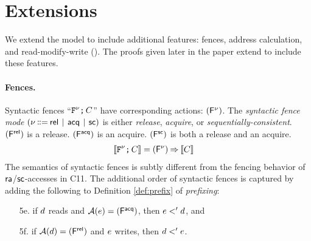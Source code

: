 \section{Extensions}
\label{sec:variants}

We extend the model to include additional
features: fences, address calculation, and read-modify-write (\RMW). The
proofs given later in the paper extend to include these features.  

\paragraph{Fences.}

Syntactic fences
``$\texttt{F}^{\nu} \texttt{;}\,\allowbreak C$'' have corresponding  actions: $(\smash{\mathsf{F}^{\nu}})$.  The \emph{syntactic fence mode}
$(\fmode \!\!\BNFDEF\!\! \modeREL \!\BNFSEP\! \modeACQ \!\BNFSEP\! \modeSC)$
is either \emph{release}, \emph{acquire}, or \emph{sequentially-consistent}.
$(\smash{\mathsf{F}^{{\mathsf{rel}}}})$ is a release. $(\smash{\mathsf{F}^{{\mathsf{acq}}}})$ is an acquire.
$(\smash{\mathsf{F}^{{\mathsf{sc}}}})$ is both a release and an acquire.
\begin{align*}
  \llbracket\texttt{F}^{\nu}\texttt{;}\,\allowbreak C\rrbracket & =
  (\smash{\mathsf{F}^{\nu}}) \mathbin\Rightarrow \llbracket C\rrbracket
\end{align*}
The semantics of syntactic fences
is subtly different from the fencing behavior of
${\mathsf{ra}}$/${\mathsf{sc}}$-accesses in C11. 
The additional order of syntactic fences is captured by adding the following
to Definition \ref{def:prefix} of \emph{prefixing}:
\begin{enumerate}
\item[5e.] if $d$ reads and $\mathcal{A}(e)=(\smash{\mathsf{F}^{{\mathsf{acq}}}})$, then
  $e <' d$, and
\item[5f.] if $\mathcal{A}(d)=(\smash{\mathsf{F}^{{\mathsf{rel}}}})$ and $e$ writes, then
  $d <' e$.
\end{enumerate}

